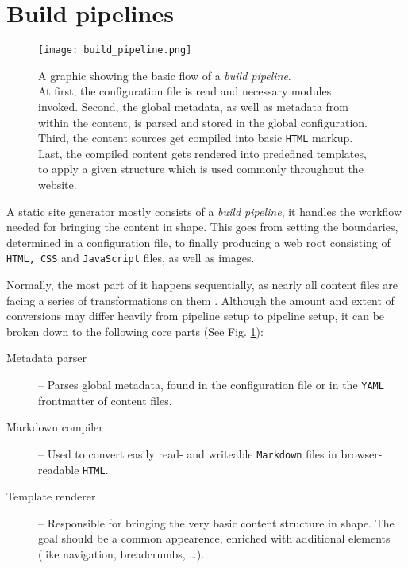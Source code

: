 \section{Build pipelines}
\label{sec:buildpipelines}

\begin{figure} %
    \centering
    \texttt{[image: build\_pipeline.png]}
    \caption{A graphic showing the basic flow of a \emph{build pipeline}.\\
    At first, the configuration file is read and necessary modules invoked. Second, the global metadata, as well as metadata from within the content, is parsed and stored in the global configuration. Third, the content sources get compiled into basic \texttt{HTML} markup. Last, the compiled content gets rendered into predefined templates, to apply a given structure which is used commonly throughout the website.}
    \label{fig:build-pipeline}
\end{figure}
%

A static site generator mostly consists of a \emph{build pipeline}, it handles the workflow needed for bringing the content in shape. This goes from setting the boundaries, determined in a configuration file, to finally producing a web root consisting of \texttt{HTML, CSS} and \texttt{JavaScript} files, as well as images.

Normally, the most part of it happens sequentially, as nearly all content files are facing a series of transformations on them \cite{Metalsmith2015technicaldocumentation}. Although the amount and extent of conversions may differ heavily from pipeline setup to pipeline setup, it can be broken down to the following core parts (See Fig. \ref{fig:build-pipeline}):

\begin{description}
  \item[Metadata parser] -- Parses global metadata, found in the configuration file or in the \texttt{YAML} frontmatter of content files.
  \item[Markdown compiler] -- Used to convert easily read- and writeable \texttt{Markdown} files in browser-readable \texttt{HTML}.
  \item[Template renderer] -- Responsible for bringing the very basic content structure in shape. The goal should be a common appearence, enriched with additional elements (like navigation, breadcrumbs, \ldots).
\end{description}

